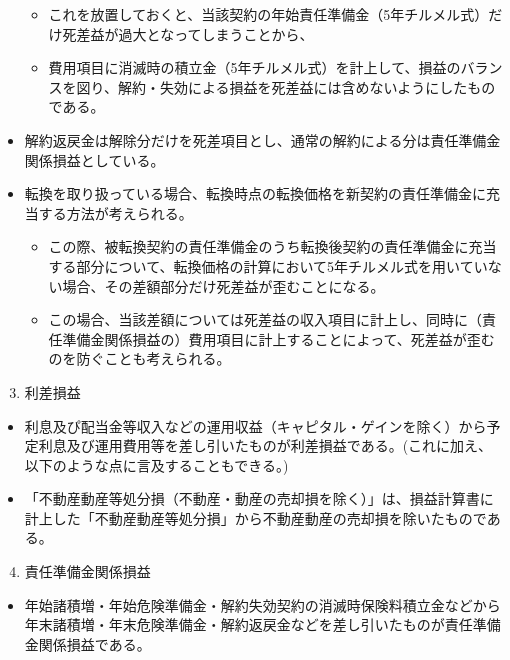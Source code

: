 \documentclass[report,gutter=10mm,fore-edge=10mm,uplatex,dvipdfmx]{jlreq}
\begin{document}
\begin{itemize}
  \begin{itemize}
  \tightlist
  \item
    これを放置しておくと、当該契約の年始責任準備金（5年チルメル式）だけ死差益が過大となってしまうことから、
  \item
    費用項目に消滅時の積立金（5年チルメル式）を計上して、損益のバランスを図り、解約・失効による損益を死差益には含めないようにしたものである。
  \end{itemize}
\item
  解約返戻金は解除分だけを死差項目とし、通常の解約による分は責任準備金関係損益としている。
\item
  転換を取り扱っている場合、転換時点の転換価格を新契約の責任準備金に充当する方法が考えられる。

  \begin{itemize}
  \tightlist
  \item
    この際、被転換契約の責任準備金のうち転換後契約の責任準備金に充当する部分について、転換価格の計算において5年チルメル式を用いていない場合、その差額部分だけ死差益が歪むことになる。
  \item
    この場合、当該差額については死差益の収入項目に計上し、同時に（責任準備金関係損益の）費用項目に計上することによって、死差益が歪むのを防ぐことも考えられる。
  \end{itemize}
\end{itemize}

\begin{enumerate}
\setcounter{enumi}{2}
\tightlist
\item
  利差損益
\end{enumerate}

\begin{itemize}
\tightlist
\item
  利息及ぴ配当金等収入などの運用収益（キャピタル・ゲインを除く）から予定利息及び運用費用等を差し引いたものが利差損益である。(これに加え、以下のような点に言及することもできる。)
\item
  「不動産動産等処分損（不動産・動産の売却損を除く）」は、損益計算書に計上した「不動産動産等処分損」から不動産動産の売却損を除いたものである。
\end{itemize}

\begin{enumerate}
\setcounter{enumi}{3}
\tightlist
\item
  責任準備金関係損益
\end{enumerate}

\begin{itemize}
\tightlist
\item
  年始諸積増・年始危険準備金・解約失効契約の消滅時保険料積立金などから年末諸積増・年末危険準備金・解約返戻金などを差し引いたものが責任準備金関係損益である。
\end{itemize}
\end{document}
